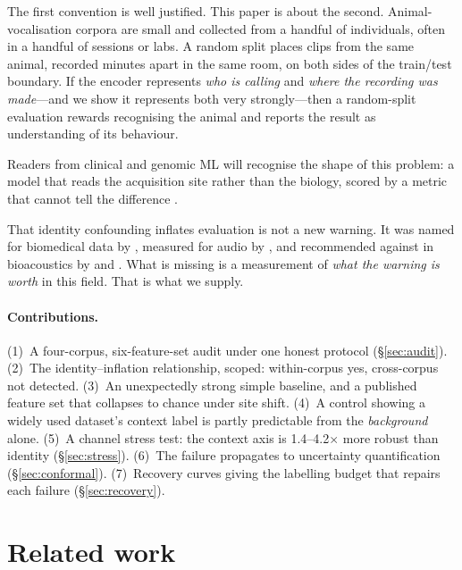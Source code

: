 \documentclass{article}
\begin{document}
The first convention is well justified. This paper is about the second. Animal-vocalisation corpora
are small and collected from a handful of individuals, often in a handful of sessions or labs. A
random split places clips from the same animal, recorded minutes apart in the same room, on both
sides of the train/test boundary. If the encoder represents \emph{who is calling} and \emph{where the
recording was made}---and we show it represents both very strongly---then a random-split evaluation
rewards recognising the animal and reports the result as understanding of its behaviour.

Readers from clinical and genomic ML will recognise the shape of this problem: a model that reads the
acquisition site rather than the biology, scored by a metric that cannot tell the difference
\citep{degrave2021,zare2026}.

That identity confounding inflates evaluation is not a new warning. It was named for biomedical data
by \citet{chaibubneto2019}, measured for audio by \citet{han2022}, and recommended against in
bioacoustics by \citet{colonna2016} and \citet{ghani2026}. What is missing is a measurement of
\emph{what the warning is worth} in this field. That is what we supply.

\paragraph{Contributions.}
(1)~A four-corpus, six-feature-set audit under one honest protocol (\S\ref{sec:audit}).
(2)~The identity--inflation relationship, scoped: within-corpus yes, cross-corpus not detected.
(3)~An unexpectedly strong simple baseline, and a published feature set that collapses to chance
under site shift.
(4)~A control showing a widely used dataset's context label is partly predictable from the
\emph{background} alone.
(5)~A channel stress test: the context axis is 1.4--4.2$\times$ more robust than identity
(\S\ref{sec:stress}).
(6)~The failure propagates to uncertainty quantification (\S\ref{sec:conformal}).
(7)~Recovery curves giving the labelling budget that repairs each failure (\S\ref{sec:recovery}).

\section{Related work}
\end{document}
